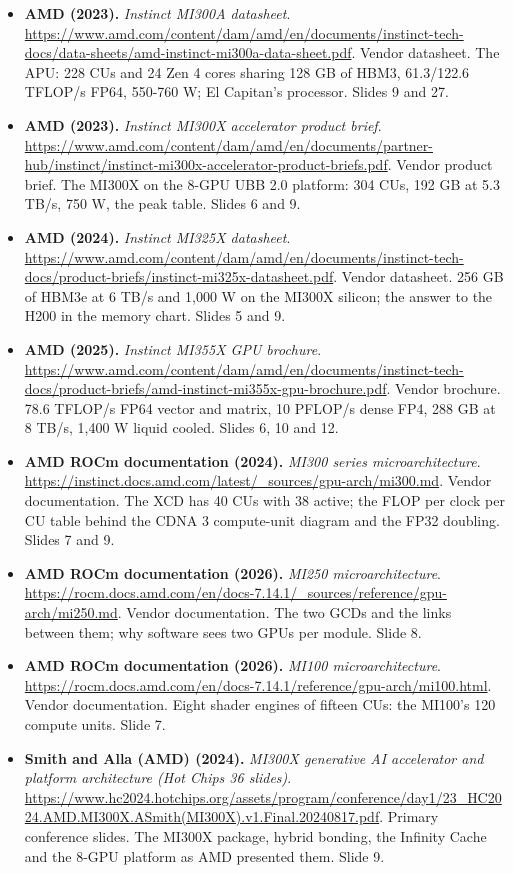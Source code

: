 \documentclass[11pt,letterpaper]{article}
\begin{document}
\begin{itemize}[leftmargin=1.2em,itemsep=3pt]
\item \textbf{AMD (2023).} \textit{Instinct MI300A datasheet}. \url{https://www.amd.com/content/dam/amd/en/documents/instinct-tech-docs/data-sheets/amd-instinct-mi300a-data-sheet.pdf}. Vendor datasheet. The APU: 228 CUs and 24 Zen 4 cores sharing 128 GB of HBM3, 61.3/122.6 TFLOP/s FP64, 550-760 W; El Capitan's processor. Slides 9 and 27.
\item \textbf{AMD (2023).} \textit{Instinct MI300X accelerator product brief}. \url{https://www.amd.com/content/dam/amd/en/documents/partner-hub/instinct/instinct-mi300x-accelerator-product-briefs.pdf}. Vendor product brief. The MI300X on the 8-GPU UBB 2.0 platform: 304 CUs, 192 GB at 5.3 TB/s, 750 W, the peak table. Slides 6 and 9.
\item \textbf{AMD (2024).} \textit{Instinct MI325X datasheet}. \url{https://www.amd.com/content/dam/amd/en/documents/instinct-tech-docs/product-briefs/instinct-mi325x-datasheet.pdf}. Vendor datasheet. 256 GB of HBM3e at 6 TB/s and 1,000 W on the MI300X silicon; the answer to the H200 in the memory chart. Slides 5 and 9.
\item \textbf{AMD (2025).} \textit{Instinct MI355X GPU brochure}. \url{https://www.amd.com/content/dam/amd/en/documents/instinct-tech-docs/product-briefs/amd-instinct-mi355x-gpu-brochure.pdf}. Vendor brochure. 78.6 TFLOP/s FP64 vector and matrix, 10 PFLOP/s dense FP4, 288 GB at 8 TB/s, 1,400 W liquid cooled. Slides 6, 10 and 12.
\item \textbf{AMD ROCm documentation (2024).} \textit{MI300 series microarchitecture}. \url{https://instinct.docs.amd.com/latest/_sources/gpu-arch/mi300.md}. Vendor documentation. The XCD has 40 CUs with 38 active; the FLOP per clock per CU table behind the CDNA 3 compute-unit diagram and the FP32 doubling. Slides 7 and 9.
\item \textbf{AMD ROCm documentation (2026).} \textit{MI250 microarchitecture}. \url{https://rocm.docs.amd.com/en/docs-7.14.1/_sources/reference/gpu-arch/mi250.md}. Vendor documentation. The two GCDs and the links between them; why software sees two GPUs per module. Slide 8.
\item \textbf{AMD ROCm documentation (2026).} \textit{MI100 microarchitecture}. \url{https://rocm.docs.amd.com/en/docs-7.14.1/reference/gpu-arch/mi100.html}. Vendor documentation. Eight shader engines of fifteen CUs: the MI100's 120 compute units. Slide 7.
\item \textbf{Smith and Alla (AMD) (2024).} \textit{MI300X generative AI accelerator and platform architecture (Hot Chips 36 slides)}. \url{https://www.hc2024.hotchips.org/assets/program/conference/day1/23_HC2024.AMD.MI300X.ASmith(MI300X).v1.Final.20240817.pdf}. Primary conference slides. The MI300X package, hybrid bonding, the Infinity Cache and the 8-GPU platform as AMD presented them. Slide 9.

\end{itemize}
\end{document}
